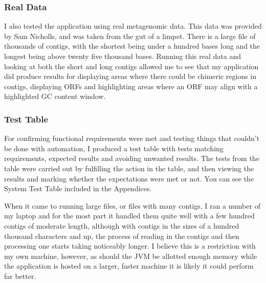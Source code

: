 \subsubsection{Real Data}
I also tested the application using real metagenomic data. This data was provided by Sam Nicholls, and was taken from the gut of a limpet. There is a large file of thousands of contigs, with the shortest being under a hundred bases long and the longest being above twenty five thousand bases. Running this real data and looking at both the short and long contigs allowed me to see that my application did produce results for displaying areas where there could be chimeric regions in contigs, displaying ORFs and highlighting areas where an ORF may align with a highlighted GC content window.

\subsubsection{Test Table}
For confirming functional requirements were met and testing things that couldn't be done with automation, I produced a test table with tests matching requirements, expected results and avoiding unwanted results. The tests from the table were carried out by fulfilling the action in the table, and then viewing the results and marking whether the expectations were met or not. You can see the System Test Table included in the Appendices.

When it came to running large files, or files with many contigs, I ran a number of my laptop and for the most part it handled them quite well with a few hundred contigs of moderate length, although with contigs in the sizes of a hundred thousand characters and up, the process of reading in the contigs and then processing one starts taking noticeably longer. I believe this is a restriction with my own machine, however, as should the JVM be allotted enough memory while the application is hosted on a larger, faster machine it is likely it could perform far better.
